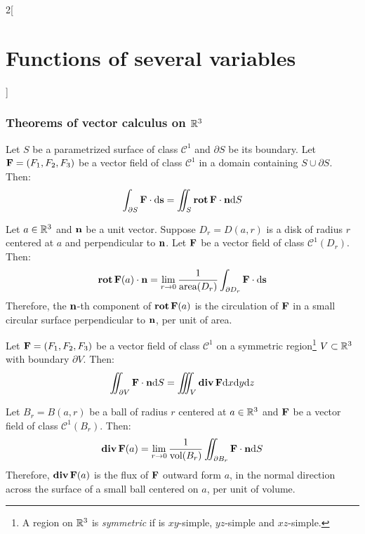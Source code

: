 \documentclass[../../../main.tex]{subfiles}
\begin{document}
\begin{multicols}{2}[\section{Functions of several variables}]
  \subsubsection{Theorems of vector calculus on \texorpdfstring{$\mathbb{R}^3$}{R3}}
  \begin{theorem}
    Let $S$ be a parametrized surface of class $\mathcal{C}^1$ and $\partial S$ be its boundary. Let $\boldsymbol{\mathrm{F}}=(F_1,F_2,F_3)$ be a vector field of class $\mathcal{C}^1$ in a domain containing $S\cup\partial S$. Then: $$\int_{\partial S}\boldsymbol{\mathrm{F}}\cdot \dd \boldsymbol{\mathrm{s}}=\iint_S\operatorname{\boldsymbol{\mathrm{rot}}}\boldsymbol{\mathrm{F}}\cdot\boldsymbol{\mathrm{n}} \dd S$$
  \end{theorem}
  \begin{corollary}
    Let $a\in\mathbb{R}^3$ and $\boldsymbol{\mathrm{n}}$ be a unit vector. Suppose $D_r=D(a,r)$ is a disk of radius $r$ centered at $a$ and perpendicular to $\boldsymbol{\mathrm{n}}$. Let $\boldsymbol{\mathrm{F}}$ be a vector field of class $\mathcal{C}^1(D_r)$. Then: $$\operatorname{\boldsymbol{\mathrm{rot}}}\boldsymbol{\mathrm{F}}(a)\cdot\boldsymbol{\mathrm{n}}=\lim_{r\to 0}\frac{1}{\text{area}(D_r)}\int_{\partial D_r}\boldsymbol{\mathrm{F}}\cdot \dd \boldsymbol{\mathrm{s}}$$ Therefore, the $\boldsymbol{\mathrm{n}}$-th component of $\operatorname{\boldsymbol{\mathrm{rot}}}\boldsymbol{\mathrm{F}}(a)$ is the circulation of $\boldsymbol{\mathrm{F}}$ in a small circular surface perpendicular to $\boldsymbol{\mathrm{n}}$, per unit of area.
  \end{corollary}
  \begin{theorem}
    Let $\boldsymbol{\mathrm{F}}=(F_1,F_2,F_3)$ be a vector field of class $\mathcal{C}^1$ on a symmetric region\footnote{A region on $\mathbb{R}^3$ is \textit{symmetric} if is $xy$-simple, $yz$-simple and $xz$-simple.} $V\subset\mathbb{R}^3$ with boundary $\partial V$. Then: $$\iint_{\partial V}\boldsymbol{\mathrm{F}}\cdot\boldsymbol{\mathrm{n}} \dd S=\iiint_V\operatorname{\boldsymbol{\mathrm{div}}}\boldsymbol{\mathrm{F}}\dd x\dd y\dd z$$
  \end{theorem}
  \begin{corollary}
    Let $B_r=B(a,r)$ be a ball of radius $r$ centered at $a\in\mathbb{R}^3$ and $\boldsymbol{\mathrm{F}}$ be a vector field of class $\mathcal{C}^1(B_r)$. Then: $$\operatorname{\boldsymbol{\mathrm{div}}}\boldsymbol{\mathrm{F}}(a)=\lim_{r\to 0}\frac{1}{\text{vol}(B_r)}\iint_{\partial B_r}\boldsymbol{\mathrm{F}}\cdot\boldsymbol{\mathrm{n}} \dd S$$ Therefore, $\operatorname{\boldsymbol{\mathrm{div}}}\boldsymbol{\mathrm{F}}(a)$ is the flux of $\boldsymbol{\mathrm{F}}$ outward form $a$, in the normal direction across the surface of a small ball centered on $a$, per unit of volume.
  \end{corollary}
\end{multicols}
\end{document}
